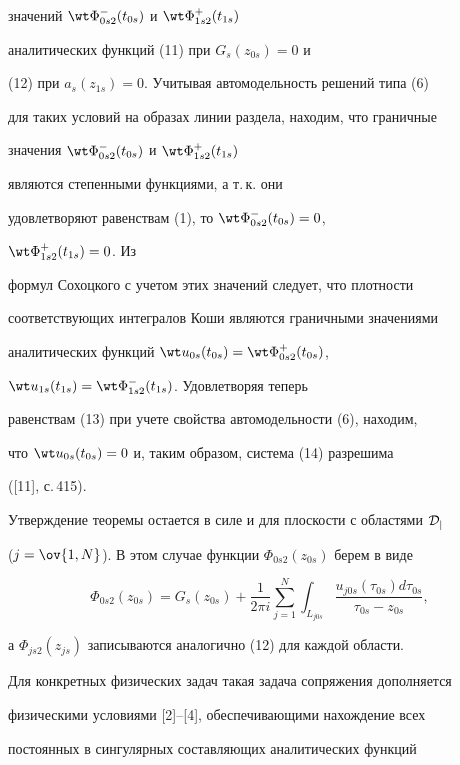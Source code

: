 значений $\wt\Phi{}^-_{0s2}(t_{0s})$ и $\wt\Phi{}^+_{1s2}(t_{1s})$ 


аналитических функций (11) при $G_s(z_{0s})=0$ и 


(12) при $a_s(z_{1s})=0$. Учитывая автомодельность решений типа (6) 


для таких условий на образах линии раздела, находим, что граничные 


значения $\wt\Phi{}^-_{0s2}(t_{0s})$ и $\wt\Phi{}^+_{1s2}(t_{1s})$ 


являются степенными функциями, а т.\,к. они 


удовлетворяют равенствам (1), то $\wt\Phi{}^-_{0s2}(t_{0s})=0$, 


$\wt\Phi{}^+_{1s2}(t_{1s})=0$. Из 


формул Сохоцкого с учетом этих значений следует, что плотности 


соответствующих интегралов Коши являются граничными значениями 


аналитических функций $\wt u_{0s}(t_{0s})=\wt\Phi{}^+_{0s2}(t_{0s})$, 


$\wt u_{1s}(t_{1s})=\wt\Phi{}^-_{1s2}(t_{1s})$. Удовлетворяя теперь 


равенствам (13) при учете свойства автомодельности (6), находим, 


что $\wt u_{0s}(t_{0s})=0$ и, таким образом, система (14) разрешима 


([11], с.\,415). 


Утверждение теоремы остается в силе и для плоскости с областями $\cal 


D_j$ 


($j=\ov{1,N}$). В этом случае функции $\Phi_{0s2}(z_{0s})$ берем в виде 


$$ 


\Phi_{0s2}(z_{0s})=G_s(z_{0s})+\frac{1}{2\pi i} 


\sum^N_{j=1}\int_{L_{j0s}} 


\frac{u_{j0s}(\tau_{0s})d\tau_{0s}}{\tau_{0s}-z_{0s}}, 


$$ 


а $\Phi_{js2}(z_{js})$ записываются аналогично (12) для каждой области. 


 


Для конкретных физических задач такая задача сопряжения дополняется 


физическими условиями [2]--[4], обеспечивающими нахождение всех 


постоянных в сингулярных составляющих аналитических функций


